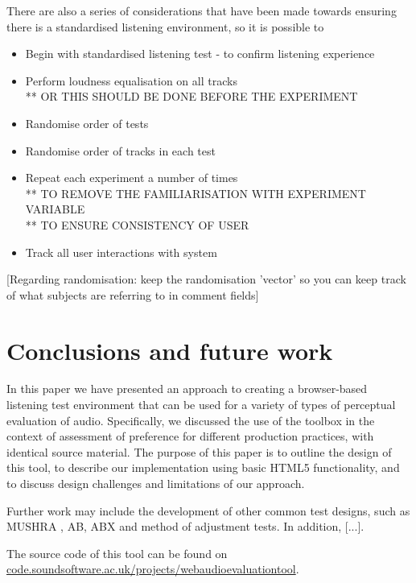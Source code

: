 \documentclass{article}
\begin{document}
There are also a series of considerations that have been made towards ensuring there is a standardised listening environment, so it is possible to
\begin{itemize}
\item Begin with standardised listening test - to confirm listening experience
\item Perform loudness equalisation on all tracks 
\\** OR THIS SHOULD BE DONE BEFORE THE EXPERIMENT
\item Randomise order of tests
\item Randomise order of tracks in each test
\item Repeat each experiment a number of times 
\\** TO REMOVE THE FAMILIARISATION WITH EXPERIMENT VARIABLE 
\\** TO ENSURE CONSISTENCY OF USER
\item Track all user interactions with system
\end{itemize}


[Regarding randomisation: keep the randomisation 'vector' so you can keep track of what subjects are referring to in comment fields]


\section{Conclusions and future work}\label{sec:conclusions}

In this paper we have presented an approach to creating a browser-based listening test environment that can be used for a variety of types of perceptual evaluation of audio. 
Specifically, we discussed the use of the toolbox in the context of assessment of preference for different production practices, with identical source material. 
The purpose of this paper is to outline the design of this tool, to describe our implementation using basic HTML5 functionality, and to discuss design challenges and limitations of our approach. %

Further work may include the development of other common test designs, such as MUSHRA \cite{mushra}, AB, ABX and method of adjustment tests. 
In addition, [...]. 



The source code of this tool can be found on \url{code.soundsoftware.ac.uk/projects/webaudioevaluationtool}. %



\end{document}
